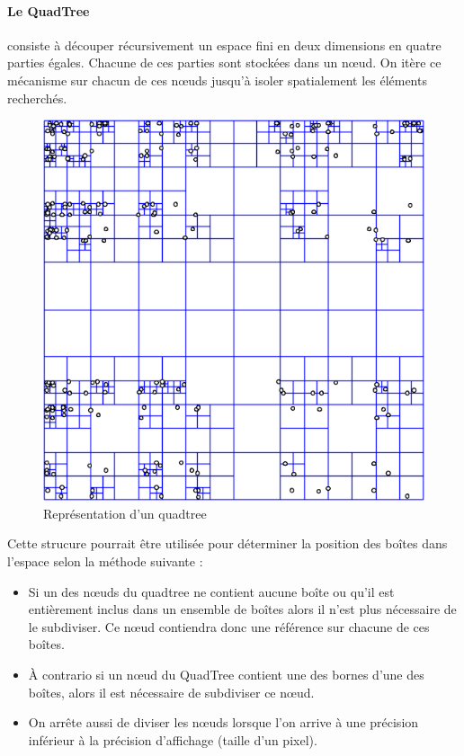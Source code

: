 \paragraph{Le QuadTree}\label{par:QT}consiste à découper récursivement un espace fini en deux dimensions en quatre parties égales. Chacune de ces parties sont stockées dans un nœud. On itère ce mécanisme sur chacun de ces nœuds jusqu'à isoler spatialement les éléments recherchés.
\begin{figure}[htbp]
\centering
\includegraphics[scale=0.50]{quadtree}
\caption{Représentation d'un quadtree}
\end{figure}
Cette strucure pourrait être utilisée pour déterminer la position des boîtes dans l'espace selon la méthode suivante :
\begin{itemize}
\item Si un des nœuds du quadtree ne contient aucune boîte ou qu'il est entièrement inclus dans un ensemble de boîtes alors il n'est plus nécessaire de le subdiviser. Ce nœud contiendra donc une référence sur chacune de ces boîtes.
\item \`A contrario si un nœud du QuadTree contient une des bornes d'une des boîtes, alors il est nécessaire de subdiviser ce nœud.
\item On arrête aussi de diviser les nœuds lorsque l'on arrive à une précision inférieur à la précision d'affichage (taille d'un pixel).
\end{itemize}

